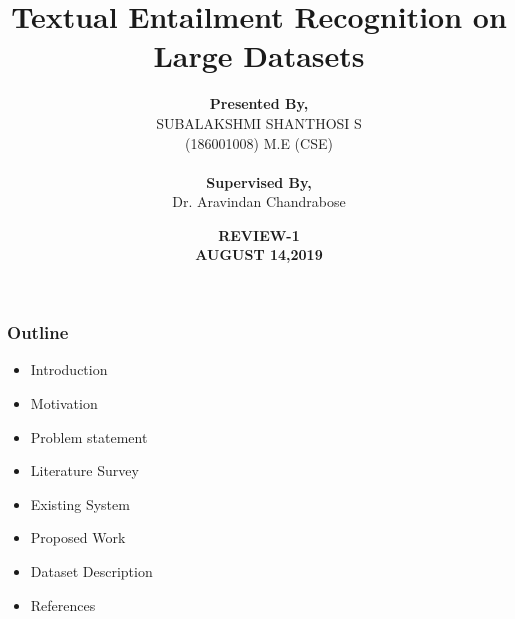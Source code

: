 \documentclass{beamer}
\begin{document}
\title{\textbf{Textual Entailment Recognition on Large Datasets} }

\author{ \textbf{ Presented By,}\\  SUBALAKSHMI SHANTHOSI S \\(186001008) M.E (CSE) \\~\\  \textbf{Supervised By,} \\ Dr. Aravindan Chandrabose}
\date{\textbf{REVIEW-1 \\ AUGUST 14,2019} }


\begin{frame}
\titlepage
\end{frame}


\begin{frame}\frametitle{Outline}
\begin{itemize}
\item Introduction
\item Motivation
\item Problem statement
\item Literature Survey
\item Existing System
\item Proposed Work
\item Dataset Description
\item References
\end{itemize}
\end{frame}
\end{document}
